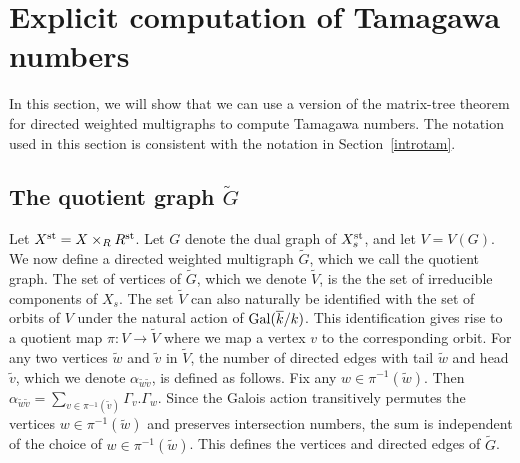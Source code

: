 \section{Explicit computation of Tamagawa numbers}\label{tamagawa}

In this section, we will show that we can use a version of the matrix-tree theorem for directed weighted multigraphs to compute Tamagawa numbers. The notation used in this section is consistent with the notation in Section~\ref{introtam}. 


\subsection{The quotient graph $\widetilde{G}$}
Let $X^{\textup{st}} = X \times_R R^{\textup{st}}$. Let $G$ denote the dual graph of $X^{\textup{st}}_s$, and let $V = V(G)$. We now define a directed weighted multigraph $\widetilde{G}$, which we call the quotient graph. The set of vertices of $\widetilde{G}$, which we denote $\widetilde{V}$, is the the set of irreducible components of $X_s$. The set $\widetilde{V}$ can also naturally be identified with the set of orbits of $V$ under the natural action of $\operatorname{Gal} (\overline{k}/k)$. This identification gives rise to a quotient map $\pi \colon V \rightarrow \widetilde{V}$ where we map a vertex $v$ to the corresponding orbit. For any two vertices $\tilde{w}$ and $\tilde{v}$ in $\widetilde{V}$, the number of directed edges with tail $\tilde{w}$ and head $\tilde{v}$, which we denote $\alpha_{\tilde{w} \tilde{v}}$, is defined as follows. Fix any $w \in \pi^{-1}(\tilde{w})$.  Then $\alpha_{\tilde{w} \tilde{v}} = \sum_{v \in \pi^{-1}(\tilde{v})} \Gamma_v.\Gamma_w$. Since the Galois action transitively permutes the 
vertices $w \in \pi^{-1}(\tilde{w})$ and preserves intersection numbers, the sum is independent of the choice of $w \in \pi^{-1}(\tilde{w})$. This defines the vertices and directed edges of $\widetilde{G}$.


